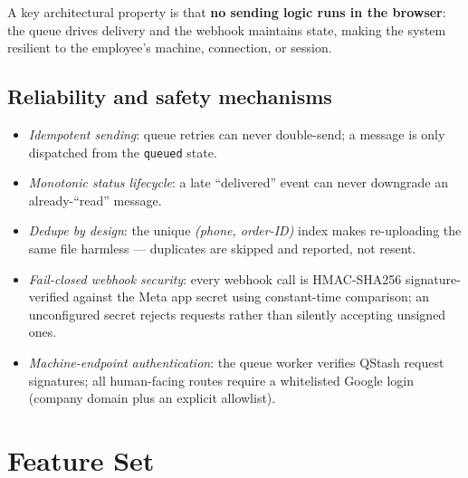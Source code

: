 \documentclass[11pt,a4paper]{article}
\begin{document}
A key architectural property is that \textbf{no sending logic runs in the
browser}: the queue drives delivery and the webhook maintains state,
making the system resilient to the employee's machine, connection, or
session.

\subsection{Reliability and safety mechanisms}

\begin{itemize}[nosep]
  \item \emph{Idempotent sending}: queue retries can never double-send; a
        message is only dispatched from the \texttt{queued} state.
  \item \emph{Monotonic status lifecycle}: a late ``delivered'' event can
        never downgrade an already-``read'' message.
  \item \emph{Dedupe by design}: the unique \emph{(phone, order-ID)} index
        makes re-uploading the same file harmless --- duplicates are
        skipped and reported, not resent.
  \item \emph{Fail-closed webhook security}: every webhook call is
        HMAC-SHA256 signature-verified against the Meta app secret using
        constant-time comparison; an unconfigured secret rejects requests
        rather than silently accepting unsigned ones.
  \item \emph{Machine-endpoint authentication}: the queue worker verifies
        QStash request signatures; all human-facing routes require a
        whitelisted Google login (company domain plus an explicit
        allowlist).
\end{itemize}

\section{Feature Set}
\end{document}
